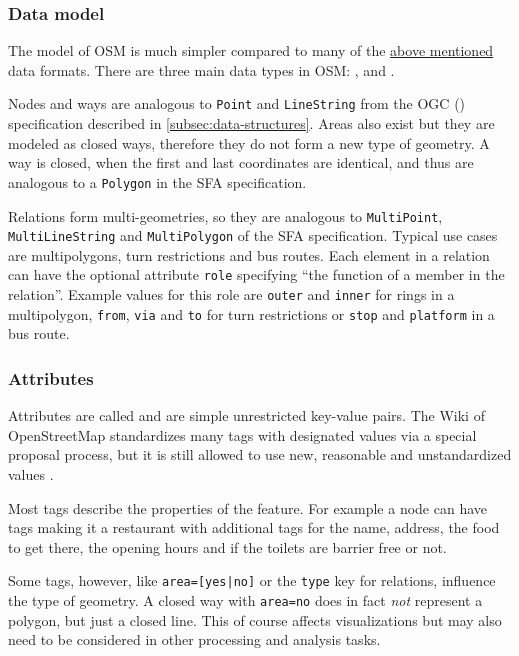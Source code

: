 		\subsubsection{Data model}
		
			The model of OSM is much simpler compared to many of the \hyperref[subsec:file-formats]{above mentioned} data formats.
			There are three main data types in OSM: ,  and \cite{osm-wiki-data-model}.
			
			Nodes and ways are analogous to \texttt{Point} and \texttt{LineString} from the OGC  () specification described in \cref{subsec:data-structures}.
			Areas also exist but they are modeled as closed ways, therefore they do not form a new type of geometry.
			A way is closed, when the first and last coordinates are identical, and thus are analogous to a \texttt{Polygon} in the SFA specification.
			
			Relations form multi-geometries, so they are analogous to \texttt{MultiPoint}, \texttt{MultiLineString} and \texttt{MultiPolygon} of the SFA specification.
			Typical use cases are multipolygons, turn restrictions and bus routes.
			Each element in a relation can have the optional attribute \texttt{role} specifying \enquote{the function of a member in the relation}\cite{osm-wiki-relation}.
			Example values for this role are \texttt{outer} and \texttt{inner} for rings in a multipolygon, \texttt{from}, \texttt{via} and \texttt{to} for turn restrictions or \texttt{stop} and \texttt{platform} in a bus route.
			
		\subsubsection{Attributes}
		\label{subsubsec:osm-attributes}
			
			Attributes are called  and are simple unrestricted key-value pairs.
			The Wiki of OpenStreetMap standardizes many tags with designated values via a special proposal process, but it is still allowed to use new, reasonable and unstandardized values \cite{osm-wiki-proposal-process}.
			
			Most tags describe the properties of the feature.
			For example a node can have tags making it a restaurant with additional tags for the name, address, the food to get there, the opening hours and if the toilets are barrier free or not.
			
			Some tags, however, like \texttt{area=[yes|no]} or the \texttt{type} key for relations, influence the type of geometry.
			A closed way with \texttt{area=no} does in fact \textit{not} represent a polygon, but just a closed line.
			This of course affects visualizations but may also need to be considered in other processing and analysis tasks.
			
